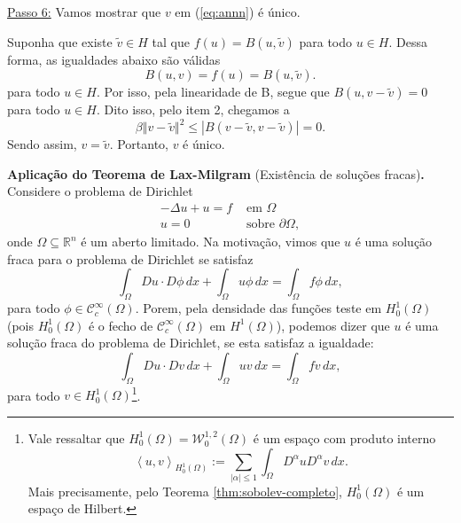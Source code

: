 \documentclass[a4paper, 11pt]{book}
\theoremstyle{definition}
\newcommand{\bR}{\mathbb{R}}
\newcommand{\cC}{\mathcal{C}}
\newcommand{\cW}{\mathcal{W}}
\begin{document}
\begin{prf}
    \underline{Passo 6:} Vamos mostrar que $v$ em (\ref{eq:annn}) é único.

    Suponha que existe $\tilde v \in H$ tal que $f(u) = B(u, \tilde v)$ para todo $u \in H$.
    Dessa forma, as igualdades abaixo são válidas
    \[
        B(u,v) = f(u) = B(u,\tilde v).
    \]
    para todo $u \in H$.
    Por isso, pela linearidade de B, segue que $B(u, v - \tilde v) = 0$ para todo $u \in H$.
    Dito isso, pelo item 2, chegamos a
    \[
        \beta \Vert v - \tilde v \Vert^2 \leqslant | B(v - \tilde v, v - \tilde v) | = 0.
    \]
    Sendo assim, $v = \tilde v$.
    Portanto, $v$ é único.
\end{prf}

\noindent\textbf{Aplicação do Teorema de Lax-Milgram} (Existência de soluções fracas)\textbf{.} Considere o problema de Dirichlet
\begin{equation} \label{eq:problema-de-dirichlet}
    \begin{aligned}
        -\Delta u + u = f &\text{ em } \Omega\\
        u = 0 &\text{ sobre } \partial\Omega,
    \end{aligned}
\end{equation}
onde $\Omega \subseteq \bR^n$ é um aberto limitado.
Na motivação, vimos que $u$ é uma solução fraca para o problema de Dirichlet se satisfaz
\[
    \int_\Omega Du \cdot D\phi \,dx + \int_\Omega u\phi \,dx = \int_\Omega f\phi \,dx,
\]
para todo $\phi \in \cC^{\infty}_c(\Omega)$.
Porem, pela densidade das funções teste em $H^{1}_0(\Omega)$ (pois $H_0^1(\Omega)$ é o fecho de $\cC^{\infty}_c(\Omega)$ em $H^1(\Omega)$), podemos dizer que $u$ é uma solução fraca do problema de Dirichlet, se esta satisfaz a igualdade:
\[
    \int_\Omega Du \cdot Dv \,dx + \int_\Omega uv \,dx = \int_\Omega fv \,dx,
\]
para todo $v \in H_0^1(\Omega)$\footnote{Vale ressaltar que $H_0^1(\Omega) = \cW^{1,2}_0(\Omega)$ é um espaço com produto interno
\[
    \left\langle u, v \right\rangle _{H^1_0(\Omega)} := \sum_{|\alpha| \leqslant 1}\int_\Omega D^\alpha u D^\alpha v \,dx.
\]
Mais precisamente, pelo Teorema \ref{thm:sobolev-completo}, $H^1_0(\Omega)$ é um espaço de Hilbert.
}.
\end{document}
